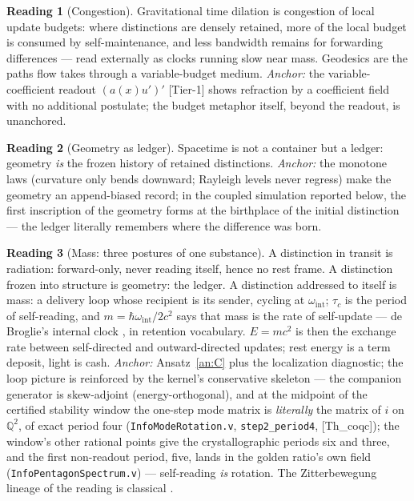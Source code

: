 \documentclass[10pt,twocolumn]{article}
\theoremstyle{definition}
\newtheorem{reading}{Reading}
\newcommand{\Thq}{\textsf{[Th\_coqc]}}
\newcommand{\Tone}{\textsf{[Tier-1]}}
\newcommand{\code}[1]{\texttt{#1}}
\begin{document}
\begin{reading}[Congestion]
Gravitational time dilation is congestion of local update budgets: where distinctions
are densely retained, more of the local budget is consumed by self-maintenance, and
less bandwidth remains for forwarding differences --- read externally as clocks
running slow near mass. Geodesics are the paths flow takes through a variable-budget
medium. \emph{Anchor:} the variable-coefficient readout
$(a(x)u')' $ \Tone{} shows refraction by a coefficient field with no additional
postulate; the budget metaphor itself, beyond the readout, is unanchored.
\end{reading}

\begin{reading}[Geometry as ledger]
Spacetime is not a container but a ledger: geometry \emph{is} the frozen history of
retained distinctions. \emph{Anchor:} the monotone laws (curvature only bends
downward; Rayleigh levels never regress) make the geometry an append-biased record;
in the coupled simulation reported below, the first inscription of the geometry forms
at the birthplace of the initial distinction --- the ledger literally remembers where
the difference was born.
\end{reading}

\begin{reading}[Mass: three postures of one substance]
A distinction in transit is radiation: forward-only, never reading itself, hence no
rest frame. A distinction frozen into structure is geometry: the ledger. A distinction
addressed to itself is mass: a delivery loop whose recipient is its sender, cycling at
$\omega_{\mathrm{int}}$; $\tau_c$ is the period of self-reading, and
$m = \hbar\omega_{\mathrm{int}}/2c^2$ says that mass is the rate of self-update
--- de Broglie's internal clock \cite{debroglie}, in retention vocabulary.
$E=mc^2$ is then the exchange rate between self-directed and outward-directed updates;
rest energy is a term deposit, light is cash. \emph{Anchor:} Ansatz~\ref{an:C} plus the localization diagnostic; the loop
picture is reinforced by the kernel's conservative skeleton --- the companion
generator is skew-adjoint (energy-orthogonal), and at the midpoint of the certified
stability window the one-step mode matrix is \emph{literally} the matrix of $i$ on
$\mathbb{Q}^2$, of exact period four (\code{InfoModeRotation.v},
\code{step2\_period4}, \Thq{}); the window's other rational points give the
crystallographic periods six and three, and the first non-readout period, five,
lands in the golden ratio's own field (\code{InfoPentagonSpectrum.v}) ---
self-reading \emph{is} rotation. The Zitterbewegung
lineage of the reading is classical \cite{schrodinger}.
\end{reading}
\end{document}

